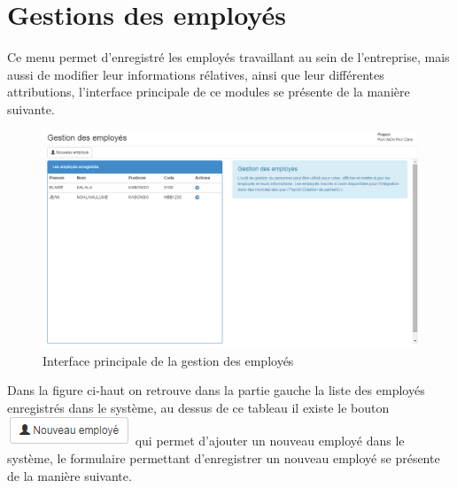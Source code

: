 \documentclass[12pt,a4paper]{report}
\begin{document}
\section{Gestions des employés}
Ce menu permet d'enregistré les employés travaillant au sein de l'entreprise, mais aussi de modifier leur informations rélatives, ainsi que leur différentes 	attributions, l'interface principale de ce modules se présente de la manière suivante.


\begin{figure}[h]
\begin{center}
\includegraphics[width=14cm]{pic/AdminEmp.png}
\end{center}
\caption{Interface principale de la gestion des employés}
\label{Interface principale de la gestion des employés}
\end{figure}

Dans la figure ci-haut on retrouve dans la partie gauche la liste des employés enregistrés dans le système, au dessus de ce tableau il existe le bouton \includegraphics[scale=1]{pic/New_emp.png} qui permet d'ajouter un nouveau employé dans le système, le formulaire permettant d'enregistrer un nouveau employé se présente de la manière suivante.
\end{document}
